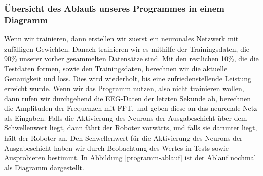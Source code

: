 \documentclass[11pt]{scrartcl}
\begin{document}
	\subsubsection{Übersicht des Ablaufs unseres Programmes in einem Diagramm}
	\begin{figure}[H]
	\end{figure}

	Wenn wir trainieren, dann erstellen wir zuerst ein neuronales Netzwerk mit zufälligen Gewichten. Danach trainieren wir es mithilfe der Trainingsdaten, die 90\% unserer vorher gesammelten Datensätze sind. Mit den restlichen 10\%, die die Testdaten formen, sowie den Trainingsdaten, berechnen wir die aktuelle Genauigkeit und loss. Dies wird wiederholt, bis eine zufriedenstellende Leistung erreicht wurde. Wenn wir das Programm nutzen, also nicht trainieren wollen, dann rufen wir durchgehend die EEG-Daten der letzten Sekunde ab, berechnen die Amplituden der Frequenzen mit FFT, und geben diese an das neuronale Netz als Eingaben. Falls die Aktivierung des Neurons der Ausgabeschicht über dem Schwellenwert liegt, dann fährt der Roboter vorwärts, und falls sie darunter liegt, hält der Roboter an. Den Schwellenwert für die Aktivierung des Neurons der Ausgabeschicht haben wir durch Beobachtung des Wertes in Tests sowie Ausprobieren bestimmt. In Abbildung \ref{programm-ablauf} ist der Ablauf nochmal als Diagramm dargestellt.

\end{document}
